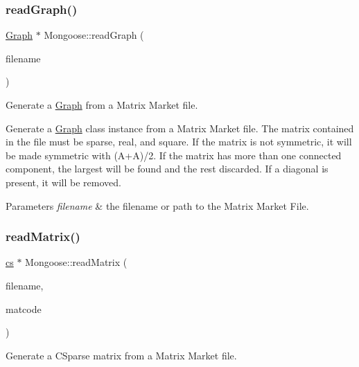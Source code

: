 \subsubsection{\texorpdfstring{read\+Graph()}{readGraph()}\hspace{0.1cm}{\footnotesize\ttfamily [2/2]}}
{\footnotesize\ttfamily \hyperlink{class_mongoose_1_1_graph}{Graph} $\ast$ Mongoose\+::read\+Graph (\begin{DoxyParamCaption}\item[{const char $\ast$}]{filename }\end{DoxyParamCaption})}



Generate a \hyperlink{class_mongoose_1_1_graph}{Graph} from a Matrix Market file. 

Generate a \hyperlink{class_mongoose_1_1_graph}{Graph} class instance from a Matrix Market file. The matrix contained in the file must be sparse, real, and square. If the matrix is not symmetric, it will be made symmetric with (A+A\textquotesingle{})/2. If the matrix has more than one connected component, the largest will be found and the rest discarded. If a diagonal is present, it will be removed.


\begin{DoxyParams}{Parameters}
{\em filename} & the filename or path to the Matrix Market File. \\
\hline
\end{DoxyParams}
\hypertarget{namespace_mongoose_a155be3fa8b76110fb4a0a69cd220de4c}{}\label{namespace_mongoose_a155be3fa8b76110fb4a0a69cd220de4c} 
\subsubsection{\texorpdfstring{read\+Matrix()}{readMatrix()}\hspace{0.1cm}{\footnotesize\ttfamily [1/2]}}
{\footnotesize\ttfamily \hyperlink{struct_mongoose_1_1cs__sparse}{cs} $\ast$ Mongoose\+::read\+Matrix (\begin{DoxyParamCaption}\item[{const std\+::string}]{filename,  }\item[{M\+M\+\_\+typecode \&}]{matcode }\end{DoxyParamCaption})}



Generate a C\+Sparse matrix from a Matrix Market file. 

